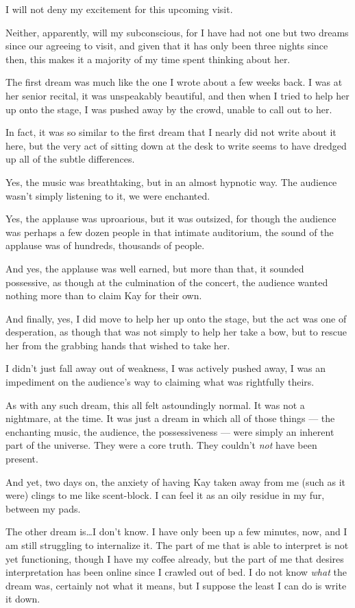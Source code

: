 I will not deny my excitement for this upcoming visit.

Neither, apparently, will my subconscious, for I have had not one but two dreams since our agreeing to visit, and given that it has only been three nights since then, this makes it a majority of my time spent thinking about her.

The first dream was much like the one I wrote about a few weeks back. I was at her senior recital, it was unspeakably beautiful, and then when I tried to help her up onto the stage, I was pushed away by the crowd, unable to call out to her.

In fact, it was so similar to the first dream that I nearly did not write about it here, but the very act of sitting down at the desk to write seems to have dredged up all of the subtle differences.

Yes, the music was breathtaking, but in an almost hypnotic way. The audience wasn't simply listening to it, we were enchanted.

Yes, the applause was uproarious, but it was outsized, for though the audience was perhaps a few dozen people in that intimate auditorium, the sound of the applause was of hundreds, thousands of people.

And yes, the applause was well earned, but more than that, it sounded possessive, as though at the culmination of the concert, the audience wanted nothing more than to claim Kay for their own.

And finally, yes, I did move to help her up onto the stage, but the act was one of desperation, as though that was not simply to help her take a bow, but to rescue her from the grabbing hands that wished to take her.

I didn't just fall away out of weakness, I was actively pushed away, I was an impediment on the audience's way to claiming what was rightfully theirs.

As with any such dream, this all felt astoundingly normal. It was not a nightmare, at the time. It was just a dream in which all of those things --- the enchanting music, the audience, the possessiveness --- were simply an inherent part of the universe. They were a core truth. They couldn't \emph{not} have been present.

And yet, two days on, the anxiety of having Kay taken away from me (such as it were) clings to me like scent-block. I can feel it as an oily residue in my fur, between my pads.

The other dream is\ldots I don't know. I have only been up a few minutes, now, and I am still struggling to internalize it. The part of me that is able to interpret is not yet functioning, though I have my coffee already, but the part of me that desires interpretation has been online since I crawled out of bed. I do not know \emph{what} the dream was, certainly not what it means, but I suppose the least I can do is write it down.

